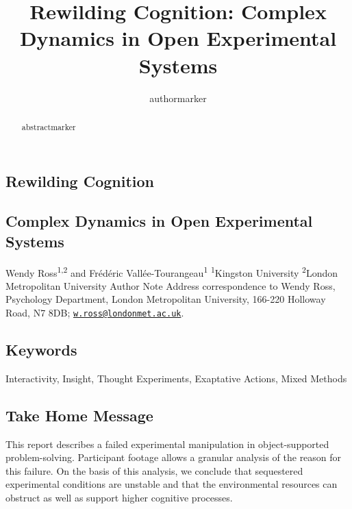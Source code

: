 \documentclass[twocolumn, serif, empirical, authordate]{jote-article}
\title{Rewilding Cognition: Complex Dynamics in Open Experimental Systems}
\author[1]{authormarker}
\affil[1]{affilmarker}
\begin{document}
    \begin{frontmatter}
    \maketitle
    \begin{abstract}
    abstractmarker
    \end{abstract}
    \end{frontmatter}

\subsection{Rewilding Cognition}


\subsection{Complex Dynamics in Open Experimental Systems}

Wendy Ross\textsuperscript{1,2} and Frédéric Vallée-Tourangeau\textsuperscript{1} 
\textsuperscript{1}Kingston University \textsuperscript{2}London Metropolitan University Author Note Address correspondence to Wendy Ross, Psychology Department, London Metropolitan University, 166-220 Holloway Road, N7 8DB; \href{mailto:w.ross@londonmet.ac.uk}{\nolinkurl{w.ross@londonmet.ac.uk}}.


\subsection{Keywords }

Interactivity, Insight, Thought Experiments, Exaptative Actions, Mixed Methods 
\subsection{Take Home Message }

This report describes a failed experimental manipulation in object-supported problem-solving. Participant footage allows a granular analysis of the reason for this failure. On the basis of this analysis, we conclude that sequestered experimental conditions are unstable and that the environmental resources can obstruct as well as support higher cognitive processes.
\end{document}
